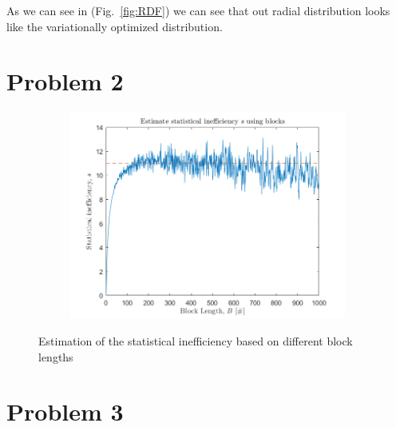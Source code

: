 As we can see in (Fig.~\ref{fig:RDF}) we can see that out radial distribution looks like the variationally optimized distribution.

\section*{Problem 2}

\begin{figure}[H]
	\centering
	\captionsetup[subfigure]{justification=centering}
	\begin{subfigure}[b]{0.4\textwidth}
		\centering
		\includegraphics[width=\textwidth]{graphics/task2/block_error.png}
	\end{subfigure}
	\caption{Estimation of the statistical inefficiency based on different block lengths}
	\label{fig:block_error}
\end{figure}


\section*{Problem 3}



